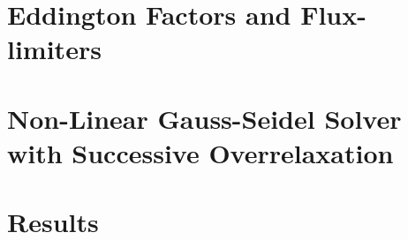 








\section{Eddington Factors and Flux-limiters}
\label{sec:fld_vef_factors}

\section{Non-Linear Gauss-Seidel Solver with Successive Overrelaxation}
\label{sec:fld_solver}

\section{Results}
\label{sec:fld_results}

